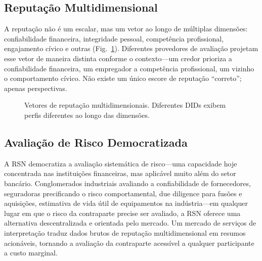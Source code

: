 \documentclass[11pt,a4paper,twocolumn]{article}
\begin{document}
\subsection{Reputação Multidimensional}

A reputação não é um escalar, mas um vetor ao longo de múltiplas dimensões: confiabilidade financeira, integridade pessoal, competência profissional, engajamento cívico e outras (Fig.~\ref{fig:reputation-radar}). Diferentes provedores de avaliação projetam esse vetor de maneira distinta conforme o contexto---um credor prioriza a confiabilidade financeira, um empregador a competência profissional, um vizinho o comportamento cívico. Não existe um único escore de reputação ``correto''; apenas perspectivas.

\begin{figure}[ht]
\centering
{}
\caption{Vetores de reputação multidimensionais. Diferentes DIDs exibem perfis diferentes ao longo das dimensões.}
\label{fig:reputation-radar}
\end{figure}

\subsection{Avaliação de Risco Democratizada}

A RSN democratiza a avaliação sistemática de risco---uma capacidade hoje concentrada nas instituições financeiras, mas aplicável muito além do setor bancário. Conglomerados industriais avaliando a confiabilidade de fornecedores, seguradoras precificando o risco comportamental, due diligence para fusões e aquisições, estimativa de vida útil de equipamentos na indústria---em qualquer lugar em que o risco da contraparte precise ser avaliado, a RSN oferece uma alternativa descentralizada e orientada pelo mercado. Um mercado de serviços de interpretação traduz dados brutos de reputação multidimensional em resumos acionáveis, tornando a avaliação da contraparte acessível a qualquer participante a custo marginal.
\end{document}
